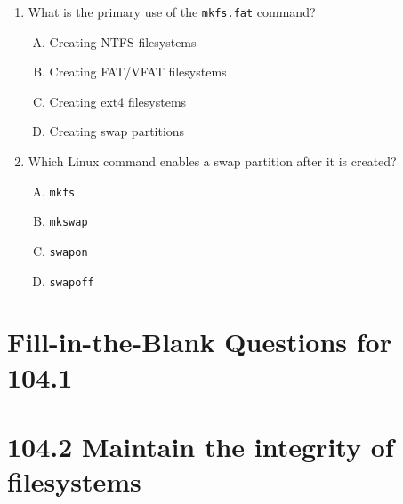 \documentclass[a4paper]{report}
\begin{document}
\begin{enumerate}[1.]
    \item What is the primary use of the \texttt{mkfs.fat} command?  
    \begin{enumerate}[A)]
        \item Creating NTFS filesystems  
        \item Creating FAT/VFAT filesystems  
        \item Creating ext4 filesystems  
        \item Creating swap partitions  
    \end{enumerate}

    \item Which Linux command enables a swap partition after it is created?  
    \begin{enumerate}[A)]
        \item \texttt{mkfs}  
        \item \texttt{mkswap}  
        \item \texttt{swapon}  
        \item \texttt{swapoff}  
    \end{enumerate}

\end{enumerate}

\newpage
\section*{Fill-in-the-Blank Questions for 104.1}

\newpage
\section*{104.2 Maintain the integrity of filesystems}

\newpage
\end{document}
